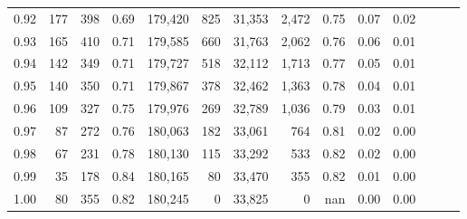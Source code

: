 \begin{tabular}{rrrrrrrrrrrrrr}
0.92 &    177 &  398 &  0.69 &  179,420 &      825 &  31,353 &   2,472 &  0.75 &  0.07 &      0.02 \\
0.93 &    165 &  410 &  0.71 &  179,585 &      660 &  31,763 &   2,062 &  0.76 &  0.06 &      0.01 \\
0.94 &    142 &  349 &  0.71 &  179,727 &      518 &  32,112 &   1,713 &  0.77 &  0.05 &      0.01 \\
0.95 &    140 &  350 &  0.71 &  179,867 &      378 &  32,462 &   1,363 &  0.78 &  0.04 &      0.01 \\
0.96 &    109 &  327 &  0.75 &  179,976 &      269 &  32,789 &   1,036 &  0.79 &  0.03 &      0.01 \\
0.97 &     87 &  272 &  0.76 &  180,063 &      182 &  33,061 &     764 &  0.81 &  0.02 &      0.00 \\
0.98 &     67 &  231 &  0.78 &  180,130 &      115 &  33,292 &     533 &  0.82 &  0.02 &      0.00 \\
0.99 &     35 &  178 &  0.84 &  180,165 &       80 &  33,470 &     355 &  0.82 &  0.01 &      0.00 \\
1.00 &     80 &  355 &  0.82 &  180,245 &        0 &  33,825 &       0 &   nan &  0.00 &      0.00 \\
\bottomrule
\end{tabular}
